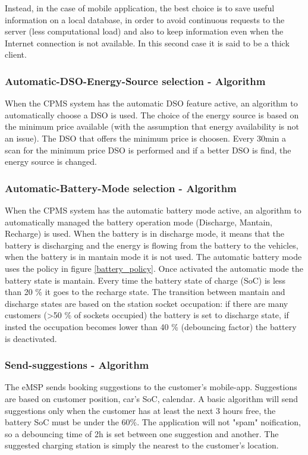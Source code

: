 Instead, in the case of mobile application, the best choice is to save useful information on a local database, in order to avoid continuous requests to the server (less computational load) and also to keep information even when the Internet connection is not available. 
In this second case it is said to be a thick client.

\subsubsection{Automatic-DSO-Energy-Source selection - Algorithm}
When the CPMS system has the automatic DSO feature active, an algorithm to automatically choose a DSO is used. The choice of the energy source is based on the minimum price available (with the assumption that energy availability is not an issue). The DSO that offers the minimum price is choosen. Every 30min a scan for the minimum price DSO is performed and if a better DSO is find, the energy source is changed.


\subsubsection{Automatic-Battery-Mode selection - Algorithm}
When the CPMS system has the automatic battery mode active, an algorithm to automatically managed the battery operation mode  (Discharge, Mantain, Recharge) is used. When the battery is in discharge mode, it means that the battery is discharging and the energy is flowing from the battery to the vehicles, when the battery is in mantain mode it is not used. The automatic battery mode uses the policy in figure \ref{battery_policy}. Once activated the automatic mode the battery state is mantain. Every time the battery state of charge (SoC) is less than 20 \% it goes to the recharge state.
The transition between mantain and discharge states are based on the station socket occupation: if there are many customers (>50 \% of sockets occupied) the battery is set to discharge state, if insted the occupation becomes lower than 40 \% (debouncing factor) the battery is deactivated.

\subsubsection{Send-suggestions - Algorithm}
The eMSP sends booking suggestions to the customer's mobile-app. Suggestions are based on customer position, car's SoC, calendar. A basic algorithm will send suggestions only when the customer has at least the next 3 hours free, the battery SoC must be under the 60\%. The application will not "spam" noification, so a debouncing time of 2h is set between one suggestion and another. The suggested charging station is simply the nearest to the customer's location.

